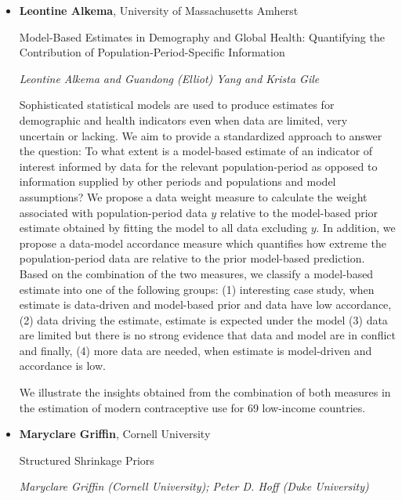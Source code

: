 \begin{itemize}
\item \textbf{Leontine Alkema}, University of Massachusetts Amherst

Model-Based Estimates in Demography and Global Health: Quantifying the Contribution of Population-Period-Specific Information

\emph{\footnotesize Leontine Alkema and Guandong (Elliot) Yang and Krista Gile}

Sophisticated statistical models are used to produce estimates for demographic and health indicators even when data are limited, very uncertain or lacking. We aim to provide a standardized approach to answer the question: To what extent is a model-based estimate of an indicator of interest informed by data for the relevant population-period as opposed to information supplied by other periods and populations and model assumptions? We propose a data weight measure to calculate the weight associated with population-period data $y$ relative to the model-based prior estimate obtained by fitting the model to all data excluding $y$. In addition, we propose a data-model accordance measure which quantifies how extreme the population-period data are relative to the prior model-based prediction. Based on the combination of the two measures, we classify a model-based estimate into one of the following groups: (1) interesting case study, when estimate is data-driven and model-based prior and data have low accordance, (2) data driving the estimate, estimate is expected under the model (3) data are limited but there is no strong evidence that data and model are in conflict and finally, (4) more data are needed, when estimate is model-driven and accordance is low.

We illustrate the insights obtained from the combination of both measures in the estimation of modern contraceptive use for 69 low-income countries.

\item \textbf{Maryclare Griffin}, Cornell University

Structured Shrinkage Priors

\emph{\footnotesize Maryclare Griffin (Cornell University); Peter D. Hoff (Duke University)}


\end{itemize}
